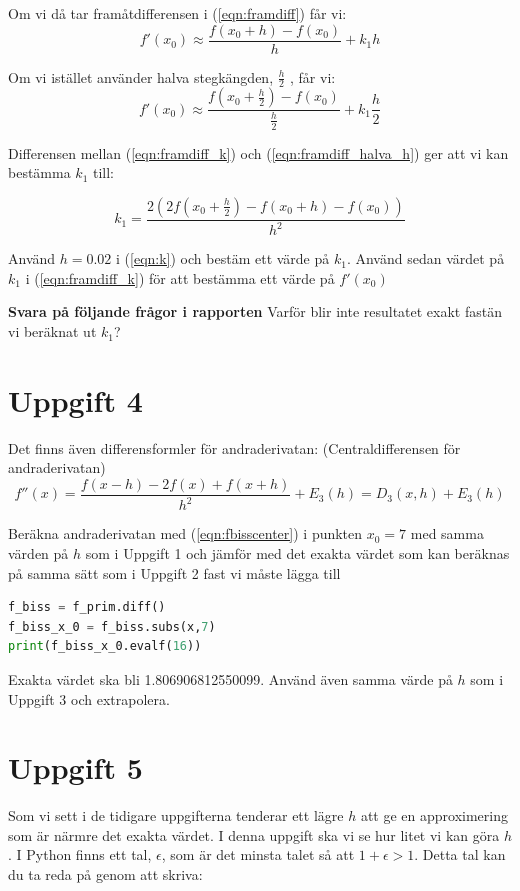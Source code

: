 \documentclass[a4paper]{article}
\begin{document}
Om vi då tar framåtdifferensen i (\ref{eqn:framdiff}) får vi:
\begin{equation} \label{eqn:framdiff_k}
  f'(x_0)\approx \frac{f(x_0+h)-f(x_0)}{h}+k_1h
\end{equation}

Om vi istället använder halva stegkängden, \( \frac{h}{2} \) , får vi:
\begin{equation} \label{eqn:framdiff_halva_h}
  f'(x_0)\approx \frac{f(x_0+\frac{h}{2})-f(x_0)}{\frac{h}{2}}+k_1 \frac{h}{2}
\end{equation}

Differensen mellan (\ref{eqn:framdiff_k}) och (\ref{eqn:framdiff_halva_h}) ger att vi kan bestämma \( k_1 \) till:

\begin{equation} \label{eqn:k}
  k_1=\frac{2\left(2f\left(x_0+\frac{h}{2}\right)-f\left(x_0+h\right)-f\left(x_0\right)\right)}{h^2}
\end{equation}

Använd \( h=0.02 \) i (\ref{eqn:k}) och bestäm ett värde på \( k_1 \). Använd sedan värdet på \( k_1 \) i (\ref{eqn:framdiff_k})
för att bestämma ett värde på \( f'(x_0) \)

\textbf{Svara på följande frågor i rapporten}
Varför blir inte resultatet exakt fastän vi beräknat ut \( k_1 \)?

\section{Uppgift 4}
Det finns även differensformler för andraderivatan: (Centraldifferensen för andraderivatan)
\begin{equation} \label{eqn:fbisscenter}
  f''(x)=\frac{f(x-h)-2f(x)+f(x+h)}{h^2}+E_3(h)=D_3(x,h)+E_3(h)
\end{equation}

Beräkna andraderivatan med (\ref{eqn:fbisscenter}) i punkten \( x_0=7 \)  med samma värden på
\( h  \)  som i Uppgift 1 och jämför med det exakta värdet som kan beräknas på samma sätt som
i Uppgift 2 fast vi måste lägga till

\begin{lstlisting}[language=Python]
f_biss = f_prim.diff()
f_biss_x_0 = f_biss.subs(x,7)
print(f_biss_x_0.evalf(16))
\end{lstlisting}

Exakta värdet ska bli 1.806906812550099. Använd även samma värde på \(h\)  som i Uppgift 3
och extrapolera.

\section{Uppgift 5}
Som vi sett i de tidigare uppgifterna tenderar ett lägre \(h\) att ge en approximering som är närmre det exakta värdet.
I denna uppgift ska vi se hur litet vi kan göra \(h\). I Python finns ett tal, \(\epsilon\), som är det minsta talet så att \(1+\epsilon>1\). Detta tal kan du ta reda på genom att skriva:
\end{document}
